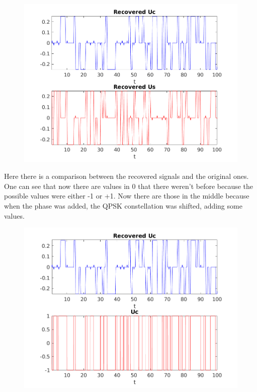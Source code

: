 \documentclass[a4paper,11pt]{article}
\begin{document}
\begin{figure}[!ht]
	\centering
	\includegraphics[scale = 0.8]{images/1_6.png}
\end{figure}

\newpage

Here there is a comparison between the recovered signals and the original ones.
One can see that now there are values in 0 that there weren't before because the
possible values were either -1 or +1. Now there are those in the middle because
when the phase was added, the QPSK constellation was shifted, adding some values.

\begin{figure}[!ht]
	\centering
	\includegraphics[scale = 0.8]{images/1_6a.png}
\end{figure}
\end{document}
